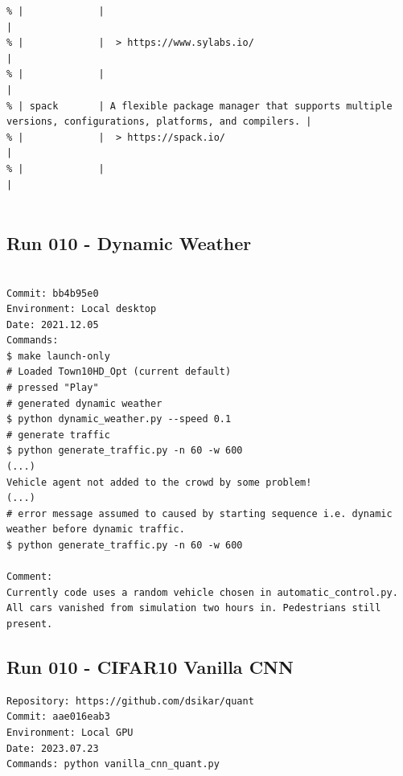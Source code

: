 \begin{verbatim}
% |             |                                                                                                       |
% |             |  > https://www.sylabs.io/                                                                             |
% |             |                                                                                                       |
% | spack       | A flexible package manager that supports multiple versions, configurations, platforms, and compilers. |
% |             |  > https://spack.io/                                                                                  |
% |             |                                                                                                       |


\end{verbatim}


\subsection{Run 010 - Dynamic Weather}
\label{app_res:010}
\begin{verbatim}

Commit: bb4b95e0
Environment: Local desktop
Date: 2021.12.05
Commands:
$ make launch-only
# Loaded Town10HD_Opt (current default)
# pressed "Play"
# generated dynamic weather
$ python dynamic_weather.py --speed 0.1
# generate traffic
$ python generate_traffic.py -n 60 -w 600
(...)
Vehicle agent not added to the crowd by some problem!
(...)
# error message assumed to caused by starting sequence i.e. dynamic weather before dynamic traffic.
$ python generate_traffic.py -n 60 -w 600

Comment:
Currently code uses a random vehicle chosen in automatic_control.py. All cars vanished from simulation two hours in. Pedestrians still present.

\end{verbatim}

\subsection{Run 010 - CIFAR10 Vanilla CNN}
\label{app_res:010}
\begin{verbatim}
Repository: https://github.com/dsikar/quant
Commit: aae016eab3
Environment: Local GPU
Date: 2023.07.23
Commands: python vanilla_cnn_quant.py

\end{verbatim}


